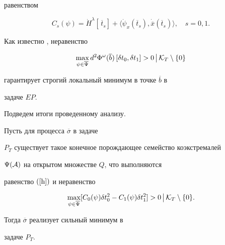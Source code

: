 равенством


$$


C_s (\psi)=\Dot{H}^{\lambda}\left[\,\overline{t}_s


\right] +\langle\Dot{\psi}_x (\overline{t}_s),


\Dot{\overline{x}}(\overline{t}_s)\rangle,\quad s=0,1.


$$


Как известно \cite{16}, неравенство


$$


\max\limits_{\psi\in\overline{\Psi}}d^2 \Phi^{\omega


}(\overline{b})\left[\delta t_0, \delta t_1 \right]


>0\,\big|\,{\cal K}_T\setminus \{0\}


$$


гарантирует строгий локальный минимум в точке $\overline{b}$ в


задаче $EP$.





Подведем итоги проведенному анализу.





\begin{thm}


Пусть для процесса $\overline{\sigma}$ в задаче


$P_T $ существует такое конечное порождающее семейство коэкстремалей


$\Psi ({\cal A})$ на открытом множестве $Q$, что выполняются


равенство $(\ref{h})$ и неравенство


$$


\max\limits_{\psi\in\overline{\Psi}}[C_0 (\psi)\delta t_0^2


-C_1 (\psi)\delta t_1^2 ]  >0\,\big|\,{\cal K}_T\setminus


\{0\}.


$$


Тогда $\overline{\sigma}$ реализует сильный минимум в


задаче $P_T $.


\end{thm}





